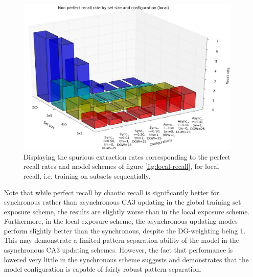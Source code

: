 \begin{figure}
    \centering
    \includegraphics[width=14cm]{fig/i-iters/local-recall-spurious}
    \caption{Displaying the spurious extraction rates corresponding to the perfect recall rates and model schemes of figure \ref{fig:local-recall}, for local recall, i.e. training on subsets sequentially.}
    \label{fig:local-recall-spurious}
\end{figure}

Note that while perfect recall by chaotic recall is significantly better for synchronous rather than asynchronous CA3 updating in the global training set exposure scheme, the results are slightly worse than in the local exposure scheme. Furthermore, in the local exposure scheme, the asynchronous updating modes perform slightly better than the synchronous, despite the DG-weighting being 1. This may demonstrate a limited pattern separation ability of the model in the asynchronous CA3 updating schemes. However, the fact that performance is lowered very little in the synchronous scheme suggests and demonstrates that the model configuration is capable of fairly robust pattern separation.

